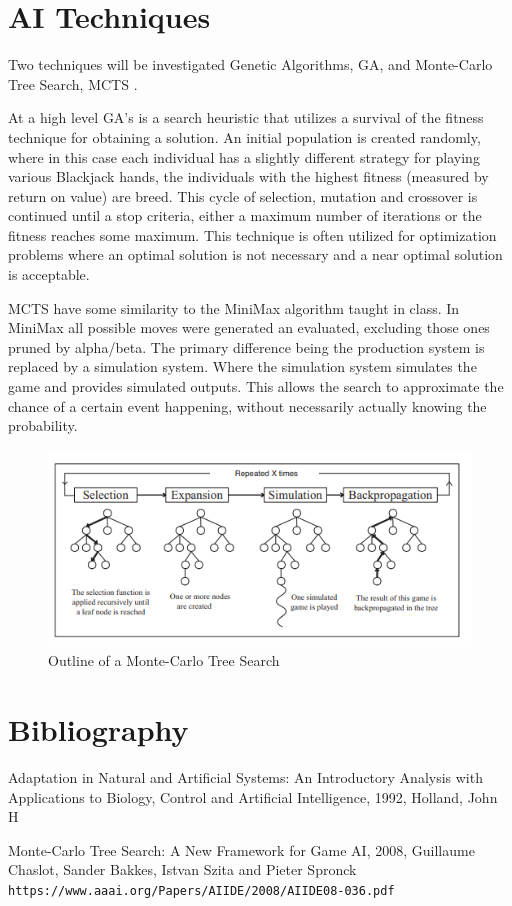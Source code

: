 \documentclass{article}
\begin{document}
\section{AI Techniques}
Two techniques will be investigated Genetic Algorithms, GA, and Monte-Carlo Tree Search, MCTS \cite{ga}\cite{mcts}. 

At a high level GA's is a search heuristic that utilizes a survival of the fitness technique for obtaining a solution. An initial population is created randomly, where in this case each individual has a slightly different strategy for playing various Blackjack hands, the individuals with the highest fitness (measured by return on value) are breed. This cycle of selection, mutation and crossover is continued until a stop criteria, either a maximum number of iterations or the fitness reaches some maximum. This technique is often utilized for optimization problems where an optimal solution is not necessary and a near optimal solution is acceptable. 

MCTS have some similarity to the MiniMax algorithm taught in class. In MiniMax all possible moves were generated an evaluated, excluding those ones pruned by alpha/beta. The primary difference being the production system is replaced by a simulation system. Where the simulation system simulates the game and provides simulated outputs. This allows the search to approximate the chance of a certain event happening, without necessarily actually knowing the probability. 

\begin{figure}[H]
\centerline{\includegraphics[scale=0.75]{mcts}}
\caption{Outline of a Monte-Carlo Tree Search}
\label{fig:vowpal_wabbit_hash}
\end{figure}


\section{Bibliography}
\begin{thebibliography}{9}

Adaptation in Natural and Artificial Systems: An Introductory Analysis with Applications to Biology, Control and Artificial Intelligence, 1992,
Holland, John H

Monte-Carlo Tree Search: A New Framework for Game AI, 2008,
Guillaume Chaslot, Sander Bakkes, Istvan Szita and Pieter Spronck
\\\texttt{https://www.aaai.org/Papers/AIIDE/2008/AIIDE08-036.pdf}
\end{thebibliography}
\end{document}

